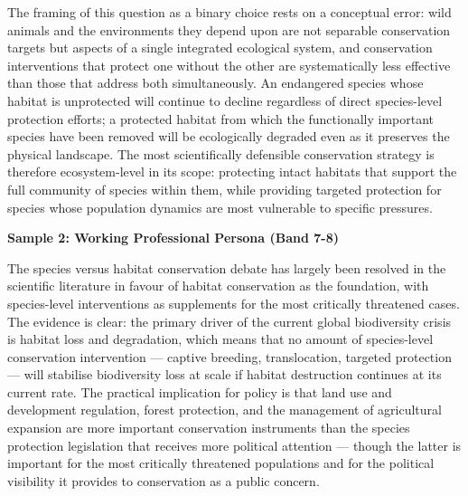 The framing of this question as a binary choice rests on a conceptual error: wild animals and the environments they depend upon are not separable conservation targets but aspects of a single integrated ecological system, and conservation interventions that protect one without the other are systematically less effective than those that address both simultaneously. An endangered species whose habitat is unprotected will continue to decline regardless of direct species-level protection efforts; a protected habitat from which the functionally important species have been removed will be ecologically degraded even as it preserves the physical landscape. The most scientifically defensible conservation strategy is therefore ecosystem-level in its scope: protecting intact habitats that support the full community of species within them, while providing targeted protection for species whose population dynamics are most vulnerable to specific pressures.

\textbf{Sample 2: Working Professional Persona (Band 7-8)}

The species versus habitat conservation debate has largely been resolved in the scientific literature in favour of habitat conservation as the foundation, with species-level interventions as supplements for the most critically threatened cases. The evidence is clear: the primary driver of the current global biodiversity crisis is habitat loss and degradation, which means that no amount of species-level conservation intervention — captive breeding, translocation, targeted protection — will stabilise biodiversity loss at scale if habitat destruction continues at its current rate. The practical implication for policy is that land use and development regulation, forest protection, and the management of agricultural expansion are more important conservation instruments than the species protection legislation that receives more political attention — though the latter is important for the most critically threatened populations and for the political visibility it provides to conservation as a public concern.

\separator


